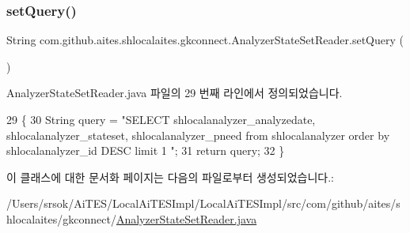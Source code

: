 \subsubsection{\texorpdfstring{set\+Query()}{setQuery()}}
{\footnotesize\ttfamily String com.\+github.\+aites.\+shlocalaites.\+gkconnect.\+Analyzer\+State\+Set\+Reader.\+set\+Query (\begin{DoxyParamCaption}{ }\end{DoxyParamCaption})}



Analyzer\+State\+Set\+Reader.\+java 파일의 29 번째 라인에서 정의되었습니다.


\begin{DoxyCode}
29                              \{
30         String query = \textcolor{stringliteral}{"SELECT shlocalanalyzer\_analyzedate, shlocalanalyzer\_stateset, shlocalanalyzer\_pneed
       from shlocalanalyzer order by shlocalanalyzer\_id DESC limit 1  "};
31         \textcolor{keywordflow}{return} query;
32     \}
\end{DoxyCode}


이 클래스에 대한 문서화 페이지는 다음의 파일로부터 생성되었습니다.\+:\begin{DoxyCompactItemize}
\item 
/\+Users/srsok/\+Ai\+T\+E\+S/\+Local\+Ai\+T\+E\+S\+Impl/\+Local\+Ai\+T\+E\+S\+Impl/src/com/github/aites/shlocalaites/gkconnect/\mbox{\hyperlink{_analyzer_state_set_reader_8java}{Analyzer\+State\+Set\+Reader.\+java}}\end{DoxyCompactItemize}
